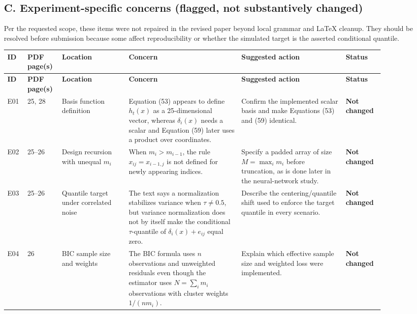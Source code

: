 \documentclass[11pt]{article}
\newcommand{\status}[1]{\textcolor{implgreen}{\textbf{#1}}}
\begin{document}
\begin{landscape}
\section*{C. Experiment-specific concerns (flagged, not substantively changed)}
Per the requested scope, these items were not repaired in the revised paper beyond local grammar and LaTeX cleanup. They should be resolved before submission because some affect reproducibility or whether the simulated target is the asserted conditional quantile.
\fontsize{7.1}{8.5}\selectfont
\renewcommand{\arraystretch}{1.22}
\setlength{\tabcolsep}{4pt}
\begin{longtable}{L{0.045\linewidth}L{0.065\linewidth}L{0.16\linewidth}L{0.275\linewidth}L{0.255\linewidth}L{0.09\linewidth}}
\toprule
\textbf{ID} & \textbf{PDF page(s)} & \textbf{Location} & \textbf{Concern} & \textbf{Suggested action} & \textbf{Status}\\
\midrule
\endfirsthead
\toprule
\textbf{ID} & \textbf{PDF page(s)} & \textbf{Location} & \textbf{Concern} & \textbf{Suggested action} & \textbf{Status}\\
\midrule
\endhead
\bottomrule
\endlastfoot
E01 & 25, 28 & Basis function definition & Equation (53) appears to define $h_t(x)$ as a 25-dimensional vector, whereas $\delta_i(x)$ needs a scalar and Equation (59) later uses a product over coordinates. & Confirm the implemented scalar basis and make Equations (53) and (59) identical. & \status{Not changed}\\
E02 & 25--26 & Design recursion with unequal $m_i$ & When $m_i>m_{i-1}$, the rule $x_{ij}=x_{i-1,j}$ is not defined for newly appearing indices. & Specify a padded array of size $M=\max_i m_i$ before truncation, as is done later in the neural-network study. & \status{Not changed}\\
E03 & 25--26 & Quantile target under correlated noise & The text says a normalization stabilizes variance when $\tau\ne0.5$, but variance normalization does not by itself make the conditional $\tau$-quantile of $\delta_i(x)+e_{ij}$ equal zero. & Describe the centering/quantile shift used to enforce the target quantile in every scenario. & \status{Not changed}\\
E04 & 26 & BIC sample size and weights & The BIC formula uses $n$ observations and unweighted residuals even though the estimator uses $N=\sum_i m_i$ observations with cluster weights $1/(nm_i)$. & Explain which effective sample size and weighted loss were implemented. & \status{Not changed}\\

\end{longtable}
\end{landscape}
\end{document}
